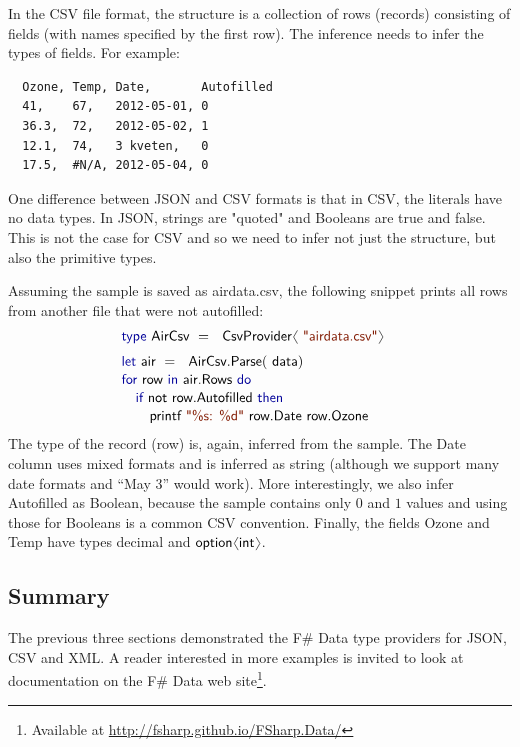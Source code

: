 \documentclass[10pt,preprint,clearpagebib]{sigplanconf}
\newcommand{\langl}{\begin{picture}(4.5,7)
\put(1.1,2.5){\rotatebox{60}{\line(1,0){5.5}}}
\put(1.1,2.5){\rotatebox{300}{\line(1,0){5.5}}}
\end{picture}}
\newcommand{\rangl}{\begin{picture}(4.5,7)
\put(.9,2.5){\rotatebox{120}{\line(1,0){5.5}}}
\put(.9,2.5){\rotatebox{240}{\line(1,0){5.5}}}
\end{picture}}
\newcommand{\kvd}[1]{\textnormal{\textcolor{kvdclr}{\sffamily #1}}}
\newcommand{\str}[1]{\textnormal{\textcolor{strclr}{\sffamily "#1"}}}
\newcommand{\strf}[1]{\textnormal{\textcolor{strclr}{\sffamily #1}}}
\newcommand{\ident}[1]{\textnormal{\sffamily #1}}
\begin{document}
In the CSV file format, the structure is a collection of rows (records) consisting of fields 
(with names specified by the first row). The inference needs to infer the types of fields.
For example:
%
{\small{
\begin{verbatim}
  Ozone, Temp, Date,       Autofilled
  41,    67,   2012-05-01, 0
  36.3,  72,   2012-05-02, 1
  12.1,  74,   3 kveten,   0
  17.5,  #N/A, 2012-05-04, 0
\end{verbatim}
}}
%
\noindent
One difference between JSON and CSV formats is that in CSV, the literals have no data types.
In JSON, strings are \str{quoted} and Booleans are \kvd{true} and \kvd{false}. This is not the
case for CSV and so we need to infer not just the structure, but also the primitive types.

Assuming the sample is saved as \strf{airdata.csv}, the following snippet prints all
rows from another file that were not autofilled:
%
\begin{equation*}
\begin{array}{l}
 \kvd{type}~\ident{AirCsv}~=~\ident{CsvProvider}\langl\str{airdata.csv}\rangl\hspace{1em} \\[0.6em]
 \kvd{let}~\ident{air}~=~\ident{AirCsv.Parse}(\ident{data})\\[0.1em]
 \kvd{for}~\ident{row}~\kvd{in}~\ident{air.Rows}~\kvd{do}\\[0.1em]
 \quad\kvd{if}~\ident{not}~\ident{row.Autofilled}~\kvd{then}\\[0.1em]
 \quad\quad \ident{printf}~\str{\%s: \%d}~\ident{row.Date row.Ozone}\\
\end{array}
\end{equation*}
%
The type of the record (\ident{row}) is, again, inferred from the sample. The \ident{Date} column
uses mixed formats and is inferred as \ident{string} (although we support many date formats and 
``May 3'' would work). More interestingly, we also infer \ident{Autofilled} as Boolean, because 
the sample contains only $0$ and $1$ values and using those for Booleans is a common CSV convention.
Finally, the fields \ident{Ozone} and \ident{Temp} have types \ident{decimal} and
$\ident{option}\langl\ident{int}\rangl$.


\subsection{Summary}
The previous three sections demonstrated the F\# Data type providers for JSON, CSV and XML.
A reader interested in more examples is invited to look at documentation on the F\# Data web 
site\footnote{Available at \url{http://fsharp.github.io/FSharp.Data/}}.
\end{document}
